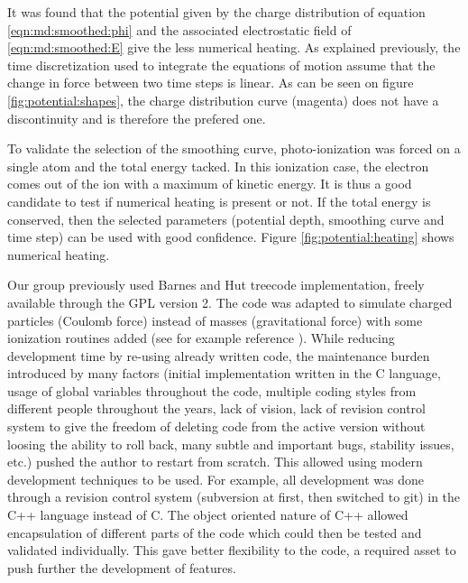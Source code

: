 It was found that the potential given by the charge distribution of equation
\eqref{eqn:md:smoothed:phi} and the associated electrostatic field of
\eqref{eqn:md:smoothed:E} give the less numerical heating. As explained
previously, the time discretization used to integrate the equations of motion
assume that the change in force between two time steps is linear. As can be
seen on figure \ref{fig:potential:shapes}, the charge distribution curve
(magenta) does not have a discontinuity and is therefore the prefered one.

To validate the selection of the smoothing curve, photo-ionization was forced
on a single atom and the total energy tacked. In this ionization case, the
electron comes out of the ion with a maximum of kinetic energy. It is thus a
good candidate to test if numerical heating is present or not. If the total
energy is conserved, then the selected parameters (potential depth, smoothing
curve and time step) can be used with good confidence. Figure
\ref{fig:potential:heating} shows numerical heating.




Our group previously used Barnes and Hut treecode implementation,
freely available\cite{treecode} through the GPL version 2. The code was adapted
to simulate charged particles (Coulomb force) instead of masses (gravitational
force) with some ionization routines added (see for example reference
\cite{Jungreuthmayer2005}). While reducing development time by re-using already
written code, the maintenance burden introduced by many factors (initial
implementation written in the C language, usage of global variables
throughout the code, multiple coding styles from different people throughout
the years, lack of vision, lack of revision control system to give the freedom
of deleting code from the active version without loosing the ability to roll
back, many subtle and important bugs, stability issues, etc.) pushed the author
to restart from scratch. This allowed using modern development techniques to be
used. For example, all development was done through a revision control system
(subversion\cite{svn} at first, then switched to git\cite{git}) in the C++
language instead of C. The object oriented nature of C++ allowed encapsulation
of different parts of the code which could then be tested and validated
individually. This gave better flexibility to the code, a required asset to
push further the development of features.

